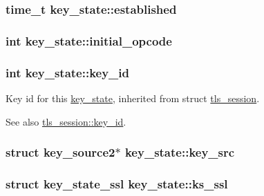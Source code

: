 \subsubsection[{established}]{\setlength{\rightskip}{0pt plus 5cm}time\+\_\+t key\+\_\+state\+::established}\label{structkey__state_a7b4fcfc00225857f9d9dbd8cf8b0a213}
\hypertarget{structkey__state_af0e663142818e5e45c4fd6b434c8c431}{}
\subsubsection[{initial\+\_\+opcode}]{\setlength{\rightskip}{0pt plus 5cm}int key\+\_\+state\+::initial\+\_\+opcode}\label{structkey__state_af0e663142818e5e45c4fd6b434c8c431}
\hypertarget{structkey__state_ab96385bedbe98845a4b5c64adb4e9f09}{}
\subsubsection[{key\+\_\+id}]{\setlength{\rightskip}{0pt plus 5cm}int key\+\_\+state\+::key\+\_\+id}\label{structkey__state_ab96385bedbe98845a4b5c64adb4e9f09}
Key id for this \hyperlink{structkey__state}{key\+\_\+state}, inherited from struct \hyperlink{structtls__session}{tls\+\_\+session}. \begin{DoxySeeAlso}{See also}
\hyperlink{structtls__session_a1255432a61acbfe1b94c15146e9698e0}{tls\+\_\+session\+::key\+\_\+id}. 
\end{DoxySeeAlso}
\hypertarget{structkey__state_af59a9aa0960261d4ed9d816b5448b732}{}
\subsubsection[{key\+\_\+src}]{\setlength{\rightskip}{0pt plus 5cm}struct {\bf key\+\_\+source2}$\ast$ key\+\_\+state\+::key\+\_\+src}\label{structkey__state_af59a9aa0960261d4ed9d816b5448b732}
\hypertarget{structkey__state_a8fe04c96cfdb018c1e0076355b866b39}{}
\subsubsection[{ks\+\_\+ssl}]{\setlength{\rightskip}{0pt plus 5cm}struct {\bf key\+\_\+state\+\_\+ssl} key\+\_\+state\+::ks\+\_\+ssl}\label{structkey__state_a8fe04c96cfdb018c1e0076355b866b39}
\hypertarget{structkey__state_a4dcda328566d402e1b0413df355398d6}{}
